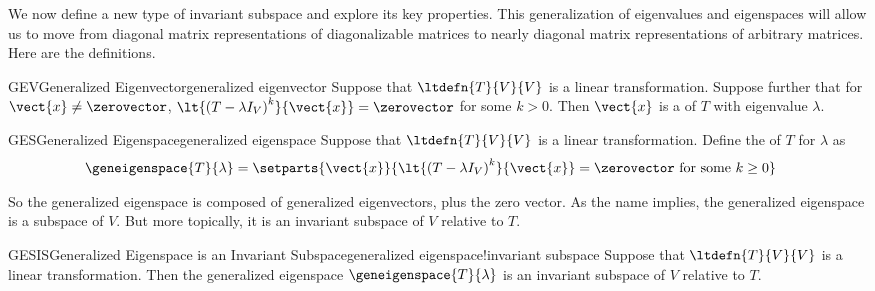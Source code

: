 %
%
We now define a new type of invariant subspace and explore its key properties.  This generalization of eigenvalues and eigenspaces will allow us to move from diagonal matrix representations of diagonalizable matrices to nearly diagonal matrix representations of arbitrary matrices.  Here are the definitions.
%
\begin{definition}{GEV}{Generalized Eigenvector}{generalized eigenvector}
Suppose that $\ltdefn{T}{V}{V}$ is a linear transformation.  Suppose further that for $\vect{x}\neq\zerovector$, $\lt{\left(T-\lambda I_V\right)^k}{\vect{x}}=\zerovector$ for some $k>0$.  Then $\vect{x}$ is a  of $T$ with eigenvalue $\lambda$.
\end{definition}
%
\begin{definition}{GES}{Generalized Eigenspace}{generalized eigenspace}
Suppose that $\ltdefn{T}{V}{V}$ is a linear transformation.  Define the  of $T$ for $\lambda$ as
%
\begin{align*}
\geneigenspace{T}{\lambda}
&=\setparts{\vect{x}}{\lt{\left(T-\lambda I_V\right)^k}{\vect{x}}=\zerovector\text{\ for some\ }k\geq 0}
\end{align*}
%
\end{definition}
%
So the generalized eigenspace is composed of generalized eigenvectors, plus the zero vector.  As the name implies, the generalized eigenspace is a subspace of $V$.  But more topically, it is an invariant subspace of $V$ relative to $T$.
%
\begin{theorem}{GESIS}{Generalized Eigenspace is an Invariant Subspace}{generalized eigenspace!invariant subspace}
Suppose that $\ltdefn{T}{V}{V}$ is a linear transformation. Then the generalized eigenspace $\geneigenspace{T}{\lambda}$ is an invariant subspace of $V$ relative to $T$.
\end{theorem}
%
